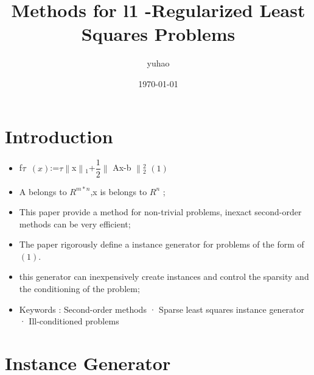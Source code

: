 \documentclass{beamer}
\begin{document}
\title{Methods for l1 -Regularized Least Squares Problems}
\author{yuhao}
\date{\today}

\begin{frame}
	\titlepage
\end{frame}

\begin{frame}
    \frametitle{\insertshorttitle}
    \tableofcontents
\end{frame}


\section{Introduction}
\begin{frame}
    \tableofcontents[currentsection]
\end{frame}

\begin{frame}
	\begin{itemize}
			\item f${\small\tau}$ $\left( x \right)$:=$\tau\parallel$x$\parallel{_1}$+$ \dfrac{1}{2} \parallel$ Ax-b $\parallel{_2^2}$ $\left(1\right)$
			\item A belongs to $R^{m*n}$,x is belongs to $R^{n}$ ;
			\item This paper provide a method for non-trivial problems, inexact second-order methods can be very efficient;
	\end{itemize}
\end{frame}

\begin{frame}
	\begin{itemize}
			\item The paper rigorously define a instance generator for problems of the form of $\left(1\right)$.
			\item this generator can inexpensively create instances and control the sparsity and the conditioning of the problem;
			\item Keywords : Second-order methods · Sparse least squares instance generator · Ill-conditioned problems
	\end{itemize}
\end{frame}


\section{Instance Generator}
\begin{frame}
    \tableofcontents[currentsection]
\end{frame}
\end{document}
